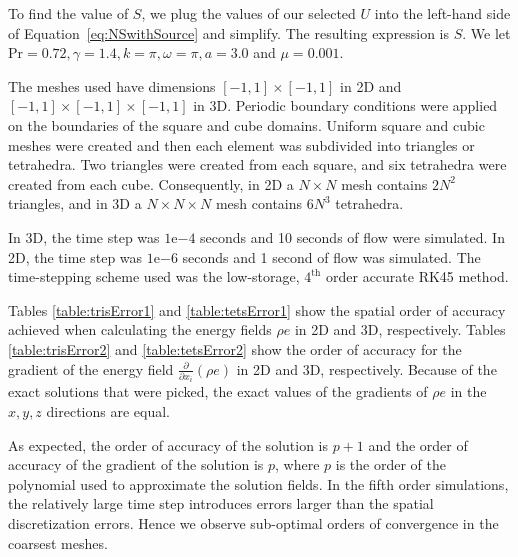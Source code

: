 To find the value of $S$, we plug the values of our selected $U$ into the left-hand side of Equation~\eqref{eq:NSwithSource} and simplify. The resulting expression is $S$. 
We let Pr$=0.72, \gamma = 1.4, k = \pi, \omega = \pi, a = 3.0$ and $\mu = 0.001$.

The meshes used have dimensions $[-1,1] \times [-1,1]$ in 2D and $[-1,1] \times [-1,1] \times [-1,1]$ in 3D. Periodic boundary conditions were applied on the boundaries of the square and cube domains. Uniform square and cubic meshes were created and then each element was subdivided into triangles or tetrahedra. Two triangles were created from each square, and six tetrahedra were created from each cube. Consequently, in 2D a $N \times N$ mesh contains $2N^2$ triangles, and in 3D a $N \times N \times N$ mesh contains $6N^3$ tetrahedra. 


In 3D, the time step was $1$e$-4$ seconds and 10 seconds of flow were simulated. In 2D, the time step was $1$e$-6$ seconds and 1 second of flow was simulated. The time-stepping scheme used was the low-storage, $4^\text{th}$ order accurate RK45 method. 







Tables \eqref{table:trisError1} and \eqref{table:tetsError1} show the spatial order of accuracy achieved when calculating the energy fields $\rho e$ in 2D and 3D, respectively. Tables \eqref{table:trisError2} and \eqref{table:tetsError2} show the order of accuracy for the gradient of the energy field $\frac{\partial }{\partial x_i}(\rho e)$ in 2D and 3D, respectively. Because of the exact solutions that were picked, the exact values of the gradients of $\rho e$ in the $x,y,z$ directions are equal.

As expected\cite{hesthaven2007}, the order of accuracy of the solution is $p+1$ and the order of accuracy of the gradient of the solution is $p$, where $p$ is the order of the polynomial used to approximate the solution fields. In the fifth order simulations, the relatively large time step introduces errors larger than the spatial discretization errors. Hence we observe sub-optimal orders of convergence in the coarsest meshes.

